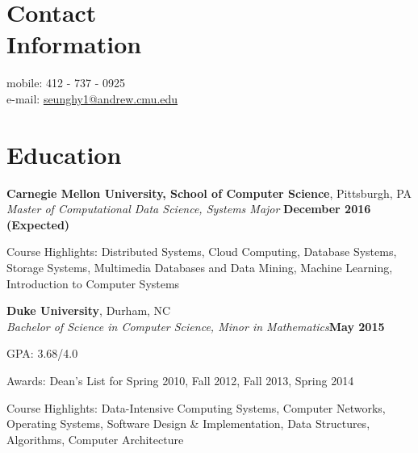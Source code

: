 \documentclass[10pt,margin,line]{resume}
\begin{document}
\begin{resume}

\section{\mysidestyle Contact\\Information}
mobile: 412 - 737 - 0925          		\vspace{0mm}\\\vspace{0mm}%
e-mail: \href{mailto:seunghy1@andrew.cmu.edu}{seunghy1@andrew.cmu.edu}	\vspace{0mm}\\\vspace{-4.5mm}%

\section{\mysidestyle Education}
\textbf{Carnegie Mellon University, School of Computer Science}, Pittsburgh, PA \\\vspace{0mm}%
\textsl{Master of Computational Data Science, Systems Major} \hfill \textbf{December 2016 (Expected)}
\vspace{-3mm}\\\vspace{-1mm}%
\begin{list3}
    \item Course Highlights: Distributed Systems, Cloud Computing, Database Systems, Storage Systems, Multimedia Databases and Data Mining, Machine Learning, Introduction to Computer Systems
\end{list3}

\textbf{Duke University}, Durham, NC \vspace{0mm}\\\vspace{0mm}%
\textsl{Bachelor of Science in Computer Science, Minor in Mathematics}\hfill \textbf{May 2015}
\vspace{-3mm}\\\vspace{-1mm}%
\begin{list3}
    \item GPA: 3.68/4.0
    \item Awards: Dean's List for Spring 2010, Fall 2012, Fall 2013, Spring 2014
    \item Course Highlights: Data-Intensive Computing Systems, Computer Networks, Operating Systems, Software Design \& Implementation, Data Structures, Algorithms, Computer Architecture
\end{list3}


\end{resume}
\end{document}
